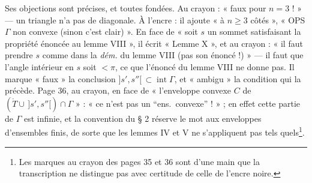 \documentclass[11pt,a4paper]{article}
\begin{document}
Ses objections sont précises, et toutes fondées. Au crayon : « faux pour $n = 3$
! » — un triangle n'a pas de diagonale. À l'encre : il ajoute « à $n \geq 3$
côtés », « OPS $\Gamma$ non convexe (sinon c'est clair) ». En face de « soit
$s$ un sommet satisfaisant la propriété énoncée au lemme VIII », il écrit
« Lemme X », et au crayon : « il faut prendre $s$ comme dans la \emph{dém.} du
lemme VIII (pas son énoncé !) » — il faut que l'angle intérieur en $s$ soit $<
\pi$, ce que l'énoncé du lemme VIII ne donne pas. Il marque « faux » la
conclusion $]s', s''[\, \subset \operatorname{int}\Gamma$, et « ambigu » la
condition qui la précède. Page 36, au crayon, en face de « l'enveloppe convexe
$C$ de $(\mathring{T} \cup\, ]s', s''[) \cap \Gamma$ » : « ce n'est pas un
“ens.\ convexe” ! » ; en effet cette partie de $\Gamma$ est infinie, et la
convention du § 2 réserve le mot aux enveloppes d'ensembles finis, de sorte que
les lemmes IV et V ne s'appliquent pas tels quels\footnote{Les marques au
crayon des pages 35 et 36 sont d'une main que la transcription ne distingue pas
avec certitude de celle de l'encre noire.}.
\end{document}
